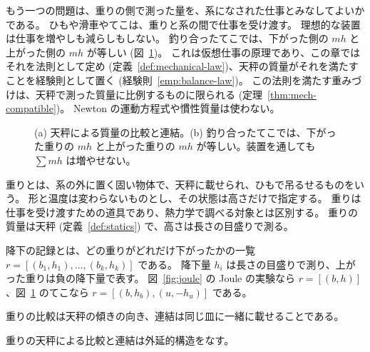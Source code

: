 もう一つの問題は、重りの側で測った量を、系になされた仕事とみなしてよいかである。
ひもや滑車やてこは、重りと系の間で仕事を受け渡す。
理想的な装置は仕事を増やしも減らしもしない。
釣り合ったてこでは、下がった側の $m h$ と上がった側の $m h$ が等しい (図~\ref{fig:lever})。
これは仮想仕事の原理であり、この章ではそれを法則として定め (定義~\ref{def:mechanical-law})、天秤の質量がそれを満たすことを経験則として置く (経験則~\ref{emp:balance-law})。
この法則を満たす重みづけは、天秤で測った質量に比例するものに限られる (定理~\ref{thm:mech-compatible})。
Newton の運動方程式や慣性質量は使わない。

\begin{figure}[htbp]
  \centering
  \caption{(a) 天秤による質量の比較と連結。(b) 釣り合ったてこでは、下がった重りの $m h$ と上がった重りの $m h$ が等しい。装置を通しても $\sum m h$ は増やせない。}
  \label{fig:lever}
\end{figure}

\begin{definition}[重り]
  \label{def:weight}
  重りとは、系の外に置く固い物体で、天秤に載せられ、ひもで吊るせるものをいう。
  形と温度は変わらないものとし、その状態は高さだけで指定する。
  重りは仕事を受け渡すための道具であり、熱力学で調べる対象とは区別する。
  重りの質量は天秤 (定義~\ref{def:statics}) で、高さは長さの目盛りで測る。
\end{definition}

\begin{definition}[降下の記録]
  \label{def:drops}
  \leanok
  降下の記録とは、どの重りがどれだけ下がったかの一覧 $r = [(b_1, h_1), \dots, (b_k, h_k)]$ である。
  降下量 $h_i$ は長さの目盛りで測り、上がった重りは負の降下量で表す。
  図~\ref{fig:joule} の Joule の実験なら $r = [(b, h)]$、図~\ref{fig:lever} のてこなら $r = [(b, h_b), (u, -h_u)]$ である。
\end{definition}

\begin{definition}[天秤]
  \label{def:statics}
  \leanok
  重りの比較は天秤の傾きの向き、連結は同じ皿に一緒に載せることである。
\end{definition}

\begin{empirical}[天秤の比較と連結]
  \label{emp:balance}
  \leanok
  重りの天秤による比較と連結は外延的構造をなす。
\end{empirical}

